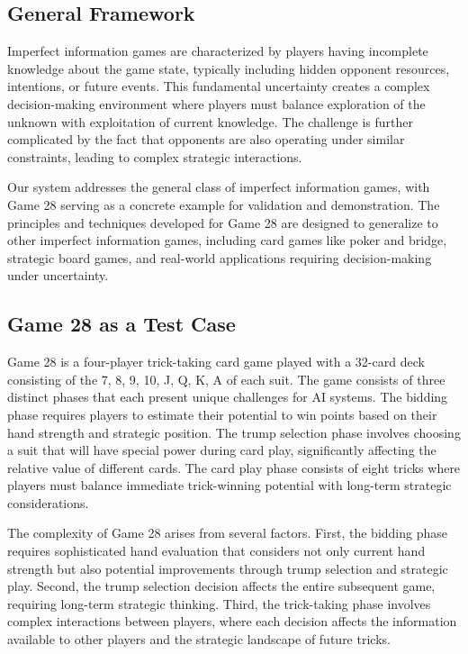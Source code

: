 \documentclass[conference]{IEEEtran}
\begin{document}
\subsection{General Framework}

Imperfect information games are characterized by players having incomplete knowledge about the game state, typically including hidden opponent resources, intentions, or future events. This fundamental uncertainty creates a complex decision-making environment where players must balance exploration of the unknown with exploitation of current knowledge. The challenge is further complicated by the fact that opponents are also operating under similar constraints, leading to complex strategic interactions.

Our system addresses the general class of imperfect information games, with Game 28 serving as a concrete example for validation and demonstration. The principles and techniques developed for Game 28 are designed to generalize to other imperfect information games, including card games like poker and bridge, strategic board games, and real-world applications requiring decision-making under uncertainty.

\subsection{Game 28 as a Test Case}

Game 28 is a four-player trick-taking card game played with a 32-card deck consisting of the 7, 8, 9, 10, J, Q, K, A of each suit. The game consists of three distinct phases that each present unique challenges for AI systems. The bidding phase requires players to estimate their potential to win points based on their hand strength and strategic position. The trump selection phase involves choosing a suit that will have special power during card play, significantly affecting the relative value of different cards. The card play phase consists of eight tricks where players must balance immediate trick-winning potential with long-term strategic considerations.

The complexity of Game 28 arises from several factors. First, the bidding phase requires sophisticated hand evaluation that considers not only current hand strength but also potential improvements through trump selection and strategic play. Second, the trump selection decision affects the entire subsequent game, requiring long-term strategic thinking. Third, the trick-taking phase involves complex interactions between players, where each decision affects the information available to other players and the strategic landscape of future tricks.
\end{document}
